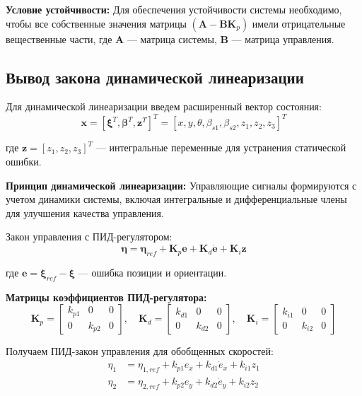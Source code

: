 \textbf{Условие устойчивости:} Для обеспечения устойчивости системы необходимо, чтобы все собственные значения матрицы $(\mathbf{A} - \mathbf{B}\mathbf{K}_p)$ имели отрицательные вещественные части, где $\mathbf{A}$ --- матрица системы, $\mathbf{B}$ --- матрица управления.

\subsection{Вывод закона динамической линеаризации}

Для динамической линеаризации введем расширенный вектор состояния:
$$\mathbf{x} = [\boldsymbol{\xi}^T, \boldsymbol{\beta}^T, \mathbf{z}^T]^T = [x, y, \theta, \beta_{s1}, \beta_{s2}, z_1, z_2, z_3]^T$$

где $\mathbf{z} = [z_1, z_2, z_3]^T$ --- интегральные переменные для устранения статической ошибки.

\textbf{Принцип динамической линеаризации:} Управляющие сигналы формируются с учетом динамики системы, включая интегральные и дифференциальные члены для улучшения качества управления.

Закон управления с ПИД-регулятором:
$$\boldsymbol{\eta} = \boldsymbol{\eta}_{ref} + \mathbf{K}_p \mathbf{e} + \mathbf{K}_d \dot{\mathbf{e}} + \mathbf{K}_i \mathbf{z}$$

где $\mathbf{e} = \boldsymbol{\xi}_{ref} - \boldsymbol{\xi}$ --- ошибка позиции и ориентации.

\textbf{Матрицы коэффициентов ПИД-регулятора:}
$$\mathbf{K}_p = \begin{bmatrix}
k_{p1} & 0 & 0 \\
0 & k_{p2} & 0
\end{bmatrix}, \quad \mathbf{K}_d = \begin{bmatrix}
k_{d1} & 0 & 0 \\
0 & k_{d2} & 0
\end{bmatrix}, \quad \mathbf{K}_i = \begin{bmatrix}
k_{i1} & 0 & 0 \\
0 & k_{i2} & 0
\end{bmatrix}$$

Получаем ПИД-закон управления для обобщенных скоростей:
\begin{align}
\eta_1 &= \eta_{1,ref} + k_{p1} e_x + k_{d1} \dot{e}_x + k_{i1} z_1 \\
\eta_2 &= \eta_{2,ref} + k_{p2} e_y + k_{d2} \dot{e}_y + k_{i2} z_2
\end{align}

